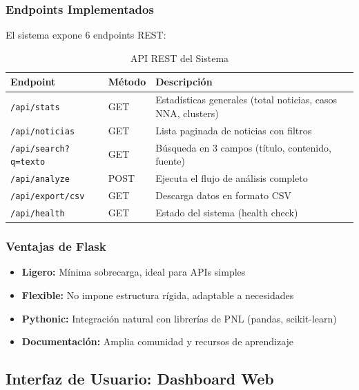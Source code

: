 \subsubsection{Endpoints Implementados}
\label{subsubsec:endpoints}

El sistema expone 6 endpoints REST:

\begin{table}[h]
\centering
\caption{API REST del Sistema}
\label{tab:api_rest}
\begin{tabular}{|l|l|p{6cm}|}
\hline
\textbf{Endpoint} & \textbf{Método} & \textbf{Descripción} \\
\hline
\texttt{/api/stats} & GET & Estadísticas generales (total noticias, casos NNA, clusters) \\
\hline
\texttt{/api/noticias} & GET & Lista paginada de noticias con filtros \\
\hline
\texttt{/api/search?q=texto} & GET & Búsqueda en 3 campos (título, contenido, fuente) \\
\hline
\texttt{/api/analyze} & POST & Ejecuta el flujo de análisis completo \\
\hline
\texttt{/api/export/csv} & GET & Descarga datos en formato CSV \\
\hline
\texttt{/api/health} & GET & Estado del sistema (health check) \\
\hline
\end{tabular}
\end{table}

\subsubsection{Ventajas de Flask}
\label{subsubsec:ventajas_flask}

\begin{itemize}
    \item \textbf{Ligero:} Mínima sobrecarga, ideal para APIs simples
    \item \textbf{Flexible:} No impone estructura rígida, adaptable a necesidades
    \item \textbf{Pythonic:} Integración natural con librerías de PNL (pandas, scikit-learn)
    \item \textbf{Documentación:} Amplia comunidad y recursos de aprendizaje
\end{itemize}

\subsection{Interfaz de Usuario: Dashboard Web}
\label{subsec:mt_dashboard}

